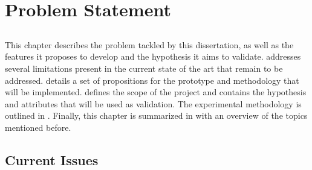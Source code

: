 \chapter{Problem Statement} \label{chap:problem_statement}

\section*{}

\minitoc \mtcskip \noindent
This chapter describes the problem tackled by this dissertation, as well as the features it proposes to develop and the hypothesis it aims to validate.  addresses several limitations present in the current state of the art that remain to be addressed.  details a set of propositions for the prototype and methodology that will be implemented.  defines the scope of the project and  contains the hypothesis and attributes that will be used as validation. The experimental methodology is outlined in . Finally, this chapter is summarized in  with an overview of the topics mentioned before.

\section{Current Issues}\label{sec:current_issues}

